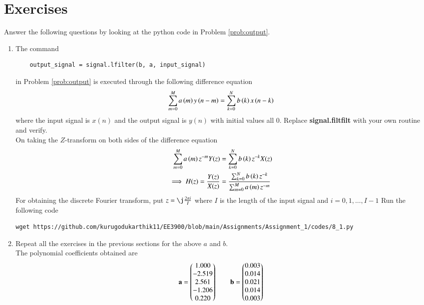 \documentclass[journal,12pt,twocolumn]{IEEEtran}
\renewcommand\thesection{\arabic{section}}
\begin{document}
 
\section{Exercises}
Answer the following questions by looking at the python code in Problem \ref{prob:output}.
\begin{enumerate}[label=\thesection.\arabic*]
\item
The command
\begin{lstlisting}
	output_signal = signal.lfilter(b, a, input_signal)
	\end{lstlisting}
in Problem \ref{prob:output} is executed through the following difference equation
\begin{equation}
\label{eq:iir_filter_gen}
 \sum _{m=0}^{M}a\left(m\right)y\left(n-m\right)=\sum _{k=0}^{N}b\left(k\right)x\left(n-k\right)
\end{equation}
%
where the input signal is $x(n)$ and the output signal is $y(n)$ with initial values all 0. Replace
\textbf{signal.filtfilt} with your own routine and verify.\\
\solution
On taking the $Z$-transform on both sides of the difference equation
	\begin{align}
		\sum _{m=0}^{M}a\left(m\right) z^{-m} Y(z) &= \sum _{k=0}^{N}b\left(k\right) z^{-k} X(z) \\
		\implies H(z) = \frac{Y(z)}{X(z)} &= \frac{\sum _{k=0}^{N}b\left(k\right) z^{-k}}{\sum _{m=0}^{M}a\left(m\right) z^{-m	}}
	\end{align}
	For obtaining the discrete Fourier transform, put $z = \j \frac{2\pi i}{I}$ where $I$ is the length of the input signal and $i = 0, 1, \ldots, I-1$
Run the following code 
\begin{lstlisting}
wget https://github.com/kurugodukarthik11/EE3900/blob/main/Assignments/Assignment_1/codes/8_1.py
\end{lstlisting}
\item Repeat all the exercises in the previous sections for the above $a$ and $b$.\\
\solution
The polynomial coefficients obtained are
	\begin{align}
		\mathbf{a} = \begin{pmatrix}1.000 \\ -2.519 \\ 2.561 \\ -1.206 \\ 0.220\end{pmatrix} \qquad
		\mathbf{b} = \begin{pmatrix}0.003 \\ 0.014 \\ 0.021 \\ 0.014 \\ 0.003\end{pmatrix}
	\end{align}
	

\end{enumerate}
\end{document}
